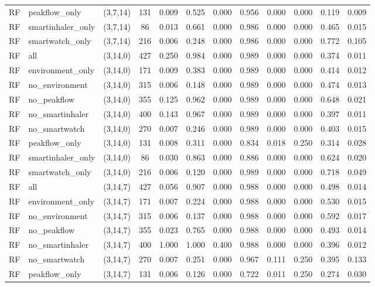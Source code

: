 \begin{longtable}{llcccccccccc}
RF & peakflow\_only & (3,7,14) & 131 & 0.009 & 0.525 & 0.000 & 0.956 & 0.000 & 0.000 & 0.119 & 0.009 \\
RF & smartinhaler\_only & (3,7,14) & 86 & 0.013 & 0.661 & 0.000 & 0.986 & 0.000 & 0.000 & 0.465 & 0.015 \\
RF & smartwatch\_only & (3,7,14) & 216 & 0.006 & 0.248 & 0.000 & 0.986 & 0.000 & 0.000 & 0.772 & 0.105 \\
RF & all & (3,14,0) & 427 & 0.250 & 0.984 & 0.000 & 0.989 & 0.000 & 0.000 & 0.374 & 0.011 \\
RF & environment\_only & (3,14,0) & 171 & 0.009 & 0.383 & 0.000 & 0.989 & 0.000 & 0.000 & 0.414 & 0.012 \\
RF & no\_environment & (3,14,0) & 315 & 0.006 & 0.148 & 0.000 & 0.989 & 0.000 & 0.000 & 0.474 & 0.013 \\
RF & no\_peakflow & (3,14,0) & 355 & 0.125 & 0.962 & 0.000 & 0.989 & 0.000 & 0.000 & 0.648 & 0.021 \\
RF & no\_smartinhaler & (3,14,0) & 400 & 0.143 & 0.967 & 0.000 & 0.989 & 0.000 & 0.000 & 0.397 & 0.011 \\
RF & no\_smartwatch & (3,14,0) & 270 & 0.007 & 0.246 & 0.000 & 0.989 & 0.000 & 0.000 & 0.403 & 0.015 \\
RF & peakflow\_only & (3,14,0) & 131 & 0.008 & 0.311 & 0.000 & 0.834 & 0.018 & 0.250 & 0.314 & 0.028 \\
RF & smartinhaler\_only & (3,14,0) & 86 & 0.030 & 0.863 & 0.000 & 0.886 & 0.000 & 0.000 & 0.624 & 0.020 \\
RF & smartwatch\_only & (3,14,0) & 216 & 0.006 & 0.120 & 0.000 & 0.989 & 0.000 & 0.000 & 0.718 & 0.049 \\
RF & all & (3,14,7) & 427 & 0.056 & 0.907 & 0.000 & 0.988 & 0.000 & 0.000 & 0.498 & 0.014 \\
RF & environment\_only & (3,14,7) & 171 & 0.007 & 0.224 & 0.000 & 0.988 & 0.000 & 0.000 & 0.530 & 0.015 \\
RF & no\_environment & (3,14,7) & 315 & 0.006 & 0.137 & 0.000 & 0.988 & 0.000 & 0.000 & 0.592 & 0.017 \\
RF & no\_peakflow & (3,14,7) & 355 & 0.023 & 0.765 & 0.000 & 0.988 & 0.000 & 0.000 & 0.493 & 0.014 \\
RF & no\_smartinhaler & (3,14,7) & 400 & 1.000 & 1.000 & 0.400 & 0.988 & 0.000 & 0.000 & 0.396 & 0.012 \\
RF & no\_smartwatch & (3,14,7) & 270 & 0.007 & 0.251 & 0.000 & 0.967 & 0.111 & 0.250 & 0.395 & 0.133 \\
RF & peakflow\_only & (3,14,7) & 131 & 0.006 & 0.126 & 0.000 & 0.722 & 0.011 & 0.250 & 0.274 & 0.030 \\

\end{longtable}
